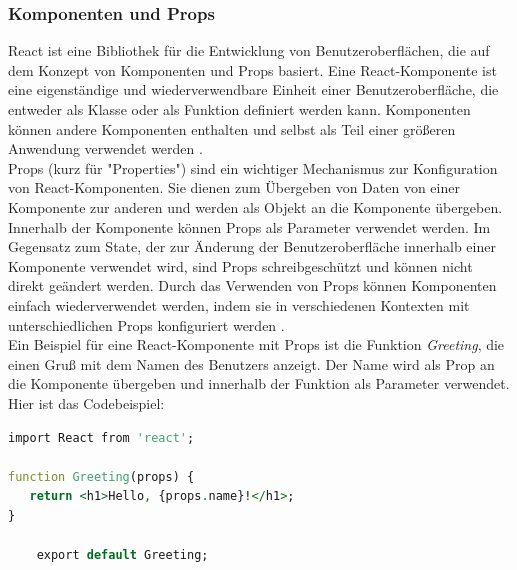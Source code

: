 \subsubsection{Komponenten und Props}
React ist eine Bibliothek für die Entwicklung von Benutzeroberflächen, die auf dem Konzept von Komponenten und Props basiert. Eine React-Komponente ist eine eigenständige und wiederverwendbare Einheit einer Benutzeroberfläche, die entweder als Klasse oder als Funktion definiert werden kann. Komponenten können andere Komponenten enthalten und selbst als Teil einer größeren Anwendung verwendet werden \cite{ReactComponentsAndProps}.\\
Props (kurz für "Properties") sind ein wichtiger Mechanismus zur Konfiguration von React-Komponenten. Sie dienen zum Übergeben von Daten von einer Komponente zur anderen und werden als Objekt an die Komponente übergeben. Innerhalb der Komponente können Props als Parameter verwendet werden. Im Gegensatz zum State, der zur Änderung der Benutzeroberfläche innerhalb einer Komponente verwendet wird, sind Props schreibgeschützt und können nicht direkt geändert werden. Durch das Verwenden von Props können Komponenten einfach wiederverwendet werden, indem sie in verschiedenen Kontexten mit unterschiedlichen Props konfiguriert werden \cite{ReactComponentsAndProps}.\\
Ein Beispiel für eine React-Komponente mit Props ist die Funktion \emph{Greeting}, die einen Gruß mit dem Namen des Benutzers anzeigt. Der Name wird als Prop an die Komponente übergeben und innerhalb der Funktion als Parameter verwendet. Hier ist das Codebeispiel:
\begin{lstlisting}[language=vhdl,
	frame=single,           % Ein Rahmen um den Code
	framexleftmargin=15pt,  % Rahmen link von den Zahlen
	style=algoBericht,
	label={Props-Komponenten},
	captionpos=b ,          % Caption unter den Code setzen
	caption={Beispiel Kompoonente mit Probs in React}]
import React from 'react';
	
function Greeting(props) {
   return <h1>Hello, {props.name}!</h1>;
}
	
	export default Greeting;
\end{lstlisting}

